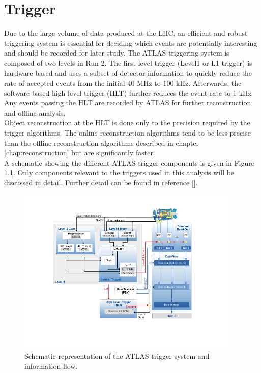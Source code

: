 \chapter{Trigger}
\label{chap:trigger}

\indent Due to the large volume of data produced at the LHC, an efficient and robust triggering system is essential for deciding which events are potentially interesting and should be recorded for later study.  The ATLAS triggering system is composed of two levels in Run 2.  The first-level trigger (Level1 or L1 trigger) is hardware based and uses a subset of detector information to quickly reduce the rate of accepted events from the initial 40 MHz to 100 kHz.  Afterwards, the software based high-level trigger (HLT) further reduces the event rate to 1 kHz.  Any events passing the HLT are recorded by ATLAS for further reconstruction and offline analysis. \\

\indent Object reconstruction at the HLT is done only to the precision required by the trigger algorithms.  The online reconstruction algorithms tend to be less precise than the offline reconstruction algorithms described in chapter \ref{chap:reconstruction} but are significantly faster. \\

\indent A schematic showing the different ATLAS trigger components is given in Figure \ref{fig:trigScheme}.  Only components relevant to the triggers used in this analysis will be discussed in detail.  Further detail can be found in reference [\cite{Trigger2015}].

\begin{figure}[h!]
  \begin{center}
    \includegraphics[width=0.95\textwidth]{figures/trigger/tdaq-schematic.png}\hspace{0.05\textwidth}
\end{center}
\caption[Schematic representation of the ATLAS trigger system and information flow]{Schematic representation of the ATLAS trigger system and information flow.\cite{Trigger2015}}
\label{fig:trigScheme} 
\end{figure}

